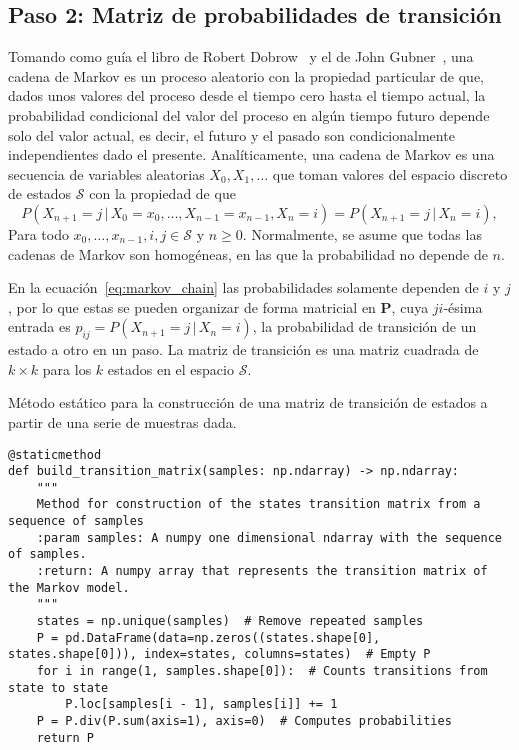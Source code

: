 \subsection*{Paso 2: Matriz de probabilidades de transición}
\label{subsec:transition_matrix}
Tomando como guía el libro de Robert Dobrow~\citeyearpar{Dobrow2016} y el de John Gubner~\citeyearpar{Gubner2006}, una cadena de Markov es un proceso aleatorio con la propiedad particular de que, dados unos valores del proceso desde el tiempo cero hasta el tiempo actual, la probabilidad condicional del valor del proceso en algún tiempo futuro depende solo del valor actual, es decir, el futuro y el pasado son condicionalmente independientes dado el presente.
Analíticamente, una cadena de Markov es una secuencia de variables aleatorias $X_0, X_1, \dots$ que toman valores del espacio discreto de estados $\mathcal{S}$ con la propiedad de que
%
\begin{equation}
    \label{eq:markov_chain}
    P\left(X_{n + 1} = j\,|\,X_0 = x_0, \dots, X_{n - 1}
    = x_{n - 1}, X_n = i\right) = P\left(X_{n + 1} = j\,|\,X_n = i\right),
\end{equation}
%
Para todo $x_0, \dots, x_{n - 1}, i, j \in \mathcal{S}$ y $n \ge 0$.
Normalmente, se asume que todas las cadenas de Markov son homogéneas, en las que la probabilidad no depende de $n$.

En la ecuación~\eqref{eq:markov_chain} las probabilidades solamente dependen de $i$ y $j$, por lo que estas se pueden organizar de forma matricial en $\mathbf{P}$, cuya $ji$-ésima entrada es $p_{ij} = P\left(X_{n + 1} = j\,|\,X_n = i\right)$, la probabilidad de transición de un estado a otro en un paso.
La matriz de transición es una matriz cuadrada de $k \times k$ para los $k$ estados en el espacio $\mathcal{S}$.

\begin{code}
    \caption{Método estático para la construcción de una matriz de transición de estados a partir de una serie de muestras dada.}
    \label{code:build_transition_matrix}
    \centering
    \begin{verbatim}
@staticmethod
def build_transition_matrix(samples: np.ndarray) -> np.ndarray:
    """
    Method for construction of the states transition matrix from a sequence of samples
    :param samples: A numpy one dimensional ndarray with the sequence of samples.
    :return: A numpy array that represents the transition matrix of the Markov model.
    """
    states = np.unique(samples)  # Remove repeated samples
    P = pd.DataFrame(data=np.zeros((states.shape[0], states.shape[0])), index=states, columns=states)  # Empty P
    for i in range(1, samples.shape[0]):  # Counts transitions from state to state
        P.loc[samples[i - 1], samples[i]] += 1
    P = P.div(P.sum(axis=1), axis=0)  # Computes probabilities
    return P
    \end{verbatim}
\end{code}

